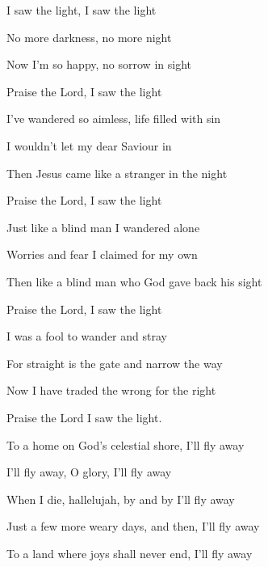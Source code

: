 \documentclass[9pt]{extarticle}
\begin{document}
\bsong

\bc
I saw the light, I saw the light

No more darkness, no more night

Now I'm so happy, no sorrow in sight

Praise the Lord, I saw the light
\ec

\bv
I've wandered so aimless, life filled with sin

I wouldn't let my dear Saviour in

Then Jesus came like a stranger in the night

Praise the Lord, I saw the light
\ev


\bv
Just like a blind man I wandered alone

Worries and fear I claimed for my own

Then like a blind man who God gave back his sight

Praise the Lord, I saw the light
\ev


\bv
I was a fool to wander and stray

For straight is the gate and narrow the way

Now I have traded the wrong for the right

Praise the Lord I saw the light.
\ev


\bv
{}

To a home on God's celestial shore, I'll fly away
\ev

\bc
I'll fly away, O glory, I'll fly away

When I die, hallelujah, by and by I'll fly away
\ec

\bv
{}

\ev


\bv
Just a few more weary days, and then, I'll fly away

To a land where joys shall never end, I'll fly away
\ev



\esong
\end{document}
